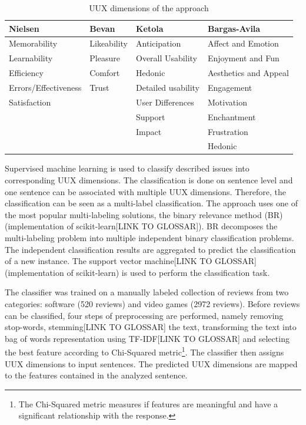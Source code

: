 \begin{table} [t]
    \centering
    \begin{small}
    \caption{UUX dimensions of the approach \cite[Table I]{Bakiu2017}}
    \label{tab:uux_dimensions}
    \setlength{\tabcolsep}{1em}
    \begin{tabular}{|l|l|l|l|}
    \hline
    \textbf{Nielsen} & \textbf{Bevan} & \textbf{Ketola} & \textbf{Bargas-Avila} \\
    \hline
    Memorability & Likeability & Anticipation & Affect and Emotion\\
    Learnability & Pleasure & Overall Usability & Enjoyment and Fun\\
    Efficiency & Comfort & Hedonic & Aesthetics and Appeal\\
    Errors/Effectiveness & Trust & Detailed usability & Engagement\\
    Satisfaction & & User Differences & Motivation\\
     & & Support & Enchantment\\
     & & Impact & Frustration\\
     & & & Hedonic\\
    \hline
    \end{tabular}
    \end{small}
\end{table}

Supervised machine learning is used to classify described issues into corresponding UUX dimensions. The classification is done on sentence level and one sentence can be associated with multiple UUX dimensions. Therefore, the classification can be seen as a multi-label classification. The approach uses one of the most popular multi-labeling solutions, the binary relevance method (BR) (implementation of scikit-learn[LINK TO GLOSSAR]). BR decomposes the multi-labeling problem into multiple independent binary classification problems. The independent classification results are aggregated to predict the classification of a new instance. The support vector machine[LINK TO GLOSSAR] (implementation of scikit-learn) is used to perform the classification task.

The classifier was trained on a manually labeled collection of reviews from two categories: software (520 reviews) and video games (2972 reviews). Before reviews can be classified, four steps of preprocessing are performed, namely removing stop-words, stemming[LINK TO GLOSSAR] the text, transforming the text into bag of words representation using TF-IDF[LINK TO GLOSSAR] and selecting the best feature according to Chi-Squared metric\footnote{The Chi-Squared metric measures if features are meaningful and have a significant relationship with the response.}. The classifier then assigns UUX dimensions to input sentences. The predicted UUX dimensions are mapped to the features contained in the analyzed sentence.

